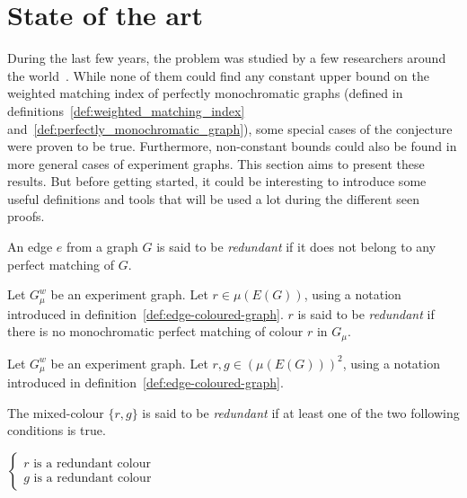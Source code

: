\chapter{State of the art}
\label{ch:state-of-the-art}

During the last few years, the problem was studied by a few researchers around the world~\cite{Krenn_2017,bogdanov,chandran,chandran2023graphtheoretic}.
While none of them could find any constant upper bound on the weighted matching index of perfectly monochromatic graphs (defined in definitions~\ref{def:weighted_matching_index} and~\ref{def:perfectly_monochromatic_graph}), some special cases of the conjecture were proven to be true.
Furthermore, non-constant bounds could also be found in more general cases of experiment graphs.
This section aims to present these results.
But before getting started, it could be interesting to introduce some useful definitions and tools that will be used a lot during the different seen proofs.


\begin{definition}
    \label{def:redundant_edge}
    An edge $e$ from a graph $G$ is said to be \textit{redundant} if it does not belong to any perfect matching of $G$.
\end{definition}

\begin{definition}
    \label{def:redundant_colour}
    Let $G_\mu^w$ be an experiment graph.
    Let $r \in \mu\left(E(G)\right)$, using a notation introduced in definition~\ref{def:edge-coloured-graph}.
    $r$ is said to be \textit{redundant} if there is no monochromatic perfect matching of colour $r$ in $G_\mu$.
\end{definition}

\begin{definition}
    \label{def:redundant_mixed_colour}
    Let $G_\mu^w$ be an experiment graph.
    Let $r, g \in \left(\mu\left(E(G)\right)\right)^2$, using a notation introduced in definition~\ref{def:edge-coloured-graph}.

    The mixed-colour $\{r, g\}$ is said to be \textit{redundant} if at least one of the two following conditions is true.
    \begin{center}
        $\left\{
        \begin{array}{l}
            r \mbox{ is a redundant colour} \\
            g \mbox{ is a redundant colour}
        \end{array}
        \right.$
    \end{center}
\end{definition}

